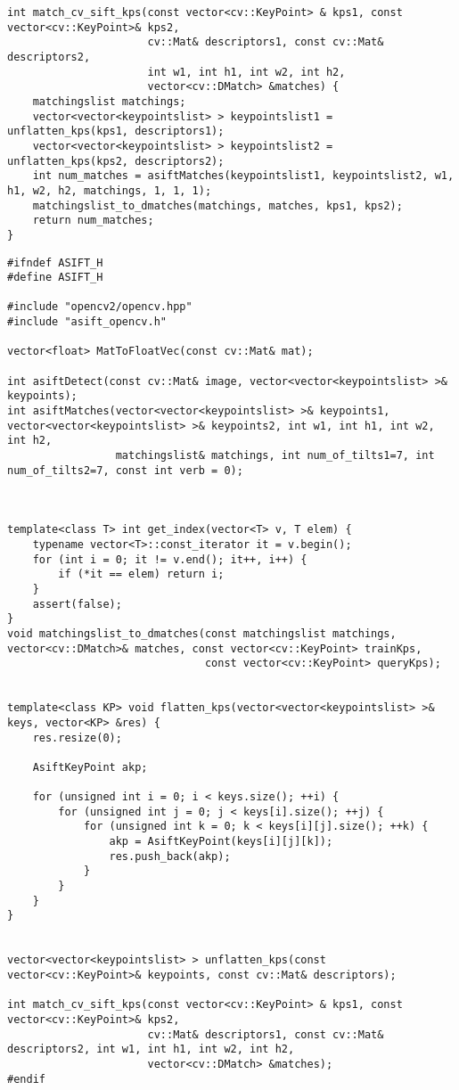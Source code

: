 \begin{lstlisting}
int match_cv_sift_kps(const vector<cv::KeyPoint> & kps1, const vector<cv::KeyPoint>& kps2,
                      cv::Mat& descriptors1, const cv::Mat& descriptors2,
                      int w1, int h1, int w2, int h2,
                      vector<cv::DMatch> &matches) {
    matchingslist matchings;
    vector<vector<keypointslist> > keypointslist1 = unflatten_kps(kps1, descriptors1);
    vector<vector<keypointslist> > keypointslist2 = unflatten_kps(kps2, descriptors2);
    int num_matches = asiftMatches(keypointslist1, keypointslist2, w1, h1, w2, h2, matchings, 1, 1, 1);
    matchingslist_to_dmatches(matchings, matches, kps1, kps2);
    return num_matches;
}
\end{lstlisting}
\begin{lstlisting}
#ifndef ASIFT_H
#define ASIFT_H

#include "opencv2/opencv.hpp"
#include "asift_opencv.h"

vector<float> MatToFloatVec(const cv::Mat& mat);

int asiftDetect(const cv::Mat& image, vector<vector<keypointslist> >& keypoints);
int asiftMatches(vector<vector<keypointslist> >& keypoints1, vector<vector<keypointslist> >& keypoints2, int w1, int h1, int w2, int h2,
                 matchingslist& matchings, int num_of_tilts1=7, int num_of_tilts2=7, const int verb = 0);



template<class T> int get_index(vector<T> v, T elem) {
    typename vector<T>::const_iterator it = v.begin();
    for (int i = 0; it != v.end(); it++, i++) {
        if (*it == elem) return i;
    }
    assert(false);
}
void matchingslist_to_dmatches(const matchingslist matchings, vector<cv::DMatch>& matches, const vector<cv::KeyPoint> trainKps,
                               const vector<cv::KeyPoint> queryKps);


template<class KP> void flatten_kps(vector<vector<keypointslist> >& keys, vector<KP> &res) {
    res.resize(0);
    
    AsiftKeyPoint akp;
    
    for (unsigned int i = 0; i < keys.size(); ++i) {
        for (unsigned int j = 0; j < keys[i].size(); ++j) {
            for (unsigned int k = 0; k < keys[i][j].size(); ++k) {
                akp = AsiftKeyPoint(keys[i][j][k]);
                res.push_back(akp);
            }
        }
    }
}


vector<vector<keypointslist> > unflatten_kps(const vector<cv::KeyPoint>& keypoints, const cv::Mat& descriptors);

int match_cv_sift_kps(const vector<cv::KeyPoint> & kps1, const vector<cv::KeyPoint>& kps2,
                      cv::Mat& descriptors1, const cv::Mat& descriptors2, int w1, int h1, int w2, int h2,
                      vector<cv::DMatch> &matches);
#endif
\end{lstlisting}
